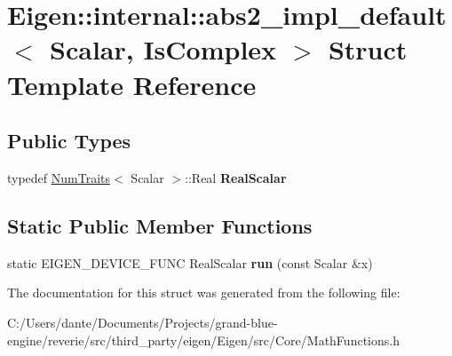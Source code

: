\hypertarget{struct_eigen_1_1internal_1_1abs2__impl__default}{}\section{Eigen\+::internal\+::abs2\+\_\+impl\+\_\+default$<$ Scalar, Is\+Complex $>$ Struct Template Reference}
\label{struct_eigen_1_1internal_1_1abs2__impl__default}
\subsection*{Public Types}
\begin{DoxyCompactItemize}
\item 
\mbox{\label{struct_eigen_1_1internal_1_1abs2__impl__default_ae21cafb44e8167f209b2019d92d3fdd1}} 
typedef \mbox{\hyperlink{struct_eigen_1_1_num_traits}{Num\+Traits}}$<$ Scalar $>$\+::Real {\bfseries Real\+Scalar}
\end{DoxyCompactItemize}
\subsection*{Static Public Member Functions}
\begin{DoxyCompactItemize}
\item 
\mbox{\label{struct_eigen_1_1internal_1_1abs2__impl__default_a760f60afa7de5087d4bd9d0d7f2d2a70}} 
static E\+I\+G\+E\+N\+\_\+\+D\+E\+V\+I\+C\+E\+\_\+\+F\+U\+NC Real\+Scalar {\bfseries run} (const Scalar \&x)
\end{DoxyCompactItemize}


The documentation for this struct was generated from the following file\+:\begin{DoxyCompactItemize}
\item 
C\+:/\+Users/dante/\+Documents/\+Projects/grand-\/blue-\/engine/reverie/src/third\+\_\+party/eigen/\+Eigen/src/\+Core/Math\+Functions.\+h\end{DoxyCompactItemize}
